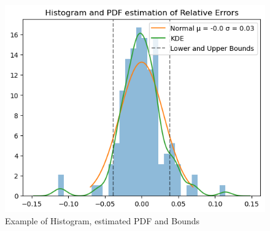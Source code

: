 \begin{figure}[h]
    \centering
    \includegraphics[width=1\columnwidth]{Implementation/hist_example.png}
    \caption{Example of Histogram, estimated PDF and Bounds}
    \label{fig: hist_example}
\end{figure}











 







